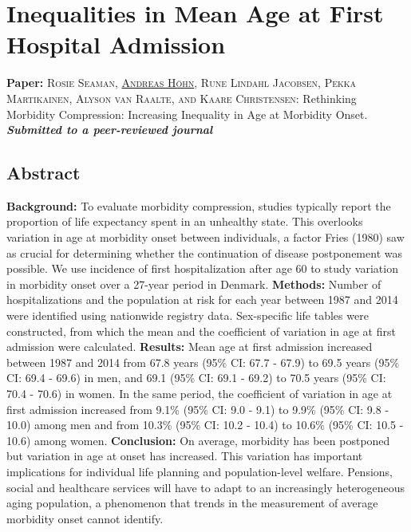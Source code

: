 
\chapter{Inequalities in Mean Age at First Hospital Admission}


\vspace{0.5in}

\textbf{Paper:}
\textsc{Rosie Seaman, \underline{Andreas H\"ohn}, Rune Lindahl Jacobsen, 
	    Pekka Martikainen, Alyson van Raalte, and Kaare Christensen:} 
		Rethinking Morbidity Compression: Increasing Inequality in Age 
		at Morbidity Onset. \textbf{\textit{Submitted to a peer-reviewed journal}}		





\newpage

\section{Abstract}
\textbf{Background:} To evaluate morbidity compression, studies typically 
report the proportion of life expectancy spent in an unhealthy state. This 
overlooks variation in age at morbidity onset between individuals, a factor 
Fries (1980) saw as crucial for determining whether the continuation of 
disease postponement was possible. We use incidence of first hospitalization 
after age 60 to study variation in morbidity onset over a 27-year period 
in Denmark. \newline
\textbf{Methods:} Number of hospitalizations and the population at risk 
for each year between 1987 and 2014 were identified using nationwide 
registry data. Sex-specific life tables were constructed, from which 
the mean and the coefficient of variation in age at first admission were 
calculated. \newline
\textbf{Results:} Mean age at first admission increased between 1987 
and 2014 from 67.8 years (95\% CI: 67.7 - 67.9) to 69.5 years (95\% CI: 
69.4 - 69.6) in men, and 69.1 (95\% CI: 69.1 - 69.2) to 70.5 years (95\% 
CI: 70.4 - 70.6) in women. In the same period, the coefficient of variation 
in age at first admission increased from 9.1\% (95\% CI: 9.0 - 9.1) to 
9.9\% (95\% CI: 9.8 - 10.0) among men and from 10.3\% (95\% CI: 10.2 - 
10.4) to 10.6\% (95\% CI: 10.5 - 10.6) among women. \newline
\textbf{Conclusion:} On average, morbidity has been postponed but variation 
in age at onset has increased. This variation has important implications for 
individual life planning and population-level welfare. Pensions, social and 
healthcare services will have to adapt to an increasingly heterogeneous aging 
population, a phenomenon that trends in the measurement of average morbidity 
onset cannot identify. 


